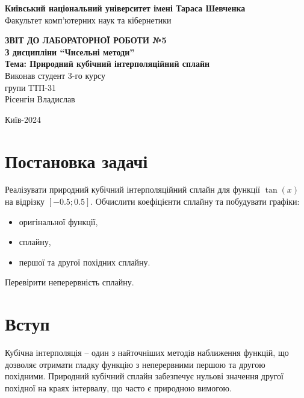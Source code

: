 \documentclass[a4paper, 12pt]{article}
\begin{document}
\begin{titlepage}
	\begin{center}
		\Large
		\textbf{Київський національний університет імені Тараса Шевченка} \\
		Факультет комп'ютерних наук та кібернетики \\

		\vspace{6cm}

		\textbf{\LARGE ЗВІТ ДО ЛАБОРАТОРНОЇ РОБОТИ №5} \\[0.5cm]
		\textbf{З дисципліни ``Чисельні методи''} \\[0.5cm]
		\textbf{Тема: Природний кубічний інтерполяційний сплайн} \\

		\vfill
		\hspace{7cm} Виконав студент 3-го курсу \\
		\hspace{7cm} групи ТТП-31 \\
		\hspace{7cm} Рісенгін Владислав \\
		\vspace{2cm}

		Київ-2024
	\end{center}
\end{titlepage}

\newpage


\section{Постановка задачі}

Реалізувати природний кубічний інтерполяційний сплайн для функції \( \tan(x) \) на відрізку \([-0.5; 0.5]\). 
Обчислити коефіцієнти сплайну та побудувати графіки:
\begin{itemize}
    \item оригінальної функції,
    \item сплайну,
    \item першої та другої похідних сплайну.
\end{itemize}
Перевірити неперервність сплайну.

\section{Вступ}

Кубічна інтерполяція -- один з найточніших методів наближення функцій, що дозволяє отримати гладку функцію з неперервними першою та другою похідними. Природний кубічний сплайн забезпечує нульові значення другої похідної на краях інтервалу, що часто є природною вимогою.
\end{document}

